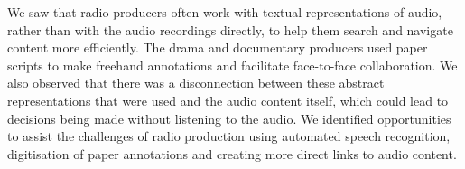 We saw that radio producers often work with textual representations of audio, rather than with the audio recordings
directly, to help them search and navigate content more efficiently.  The drama and documentary producers used paper
scripts to make freehand annotations and facilitate face-to-face collaboration. We also observed that there was a
disconnection between these abstract representations that were used and the audio content itself, which could lead to
decisions being made without listening to the audio.  We identified opportunities to assist the challenges of radio
production using automated speech recognition, digitisation of paper annotations and creating more direct links to
audio content.

